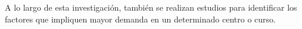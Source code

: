 A lo largo de esta investigación, también se realizan estudios para identificar los factores que impliquen mayor demanda en un determinado centro o curso.


\begin{comment}
\subsection{Minería de datos}
Con el objetivo de resolver el problema comentado anteriormente y satisfacer los objetivos, se plantea el uso de la ciencia de datos como proceso para descubrir relaciones entre los datos, que sean significativas. Además, se van a buscar patrones y tendencias en los datos que ayuden a la toma de decisiones.

En primer lugar, se debe tener en cuenta que la ciencia de datos aúna métodos y tecnologías que provienen del campo de las matemáticas, la estadística y la informática entre las que se pueden encontrar el análisis descriptivo o exploratorio, el aprendizaje automático (“machine learning”), el aprendizaje profundo (“Deep learning”), etc. \cite{MARIN2018}. En esta propuesta de intervención, se va a centrar en el \textbf{análisis descriptivo} y el \textbf{aprendizaje automático}.

El análisis descriptivo, como ya se ha comentado, va a ser útil para observar características de los propios datos. Entre estas características se va a poder observar cuales son las variables que más convienen al estudio por su importancia, utilizando técnicas como el análisis principal de componentes. El artículo de \citeA{COSTA2017247} incluye el apartado de pre-procesado, en el que realiza un estudio para reducir la dimensionalidad de las variables, puesto que están trabajando con un gran número de ellas.

El aprendizaje automático, se divide en dos áreas: el aprendizaje supervisado y el no supervisado. 


\end{comment}
